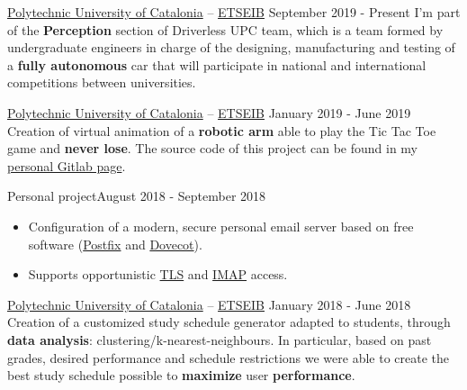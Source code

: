 \documentclass[10pt, a4paper, ragged2e]{altacv}
\begin{document}
{\href{https://www.upc.edu/en}{Polytechnic University of Catalonia} --
\href{https://etseib.upc.edu/en}{ETSEIB}}
{September 2019 - Present}{}
I'm part of the \textbf{Perception} section of Driverless UPC team, which is a
team formed by undergraduate engineers in charge of the designing, manufacturing
and testing of a \textbf{fully autonomous} car that will participate in national
and international competitions between universities.

\divider

{\href{https://www.upc.edu/en}{Polytechnic University of Catalonia} --
\href{https://etseib.upc.edu/en}{ETSEIB}}
{January 2019 - June 2019}{}
Creation of virtual animation of a \textbf{robotic arm} able to play the Tic
Tac Toe game and \textbf{never lose}. The source code of this project can be
found in my \href{https://gitlab.com/DavidAlvarez/}{personal Gitlab
  page\footnotemark}.

\divider

{Personal project}{August 2018 - September 2018}{}
\begin{itemize}
  \item Configuration of a modern, secure personal email server based on
  free software (\href{http://www.postfix.org/}{Postfix} and
  \href{https://www.dovecot.org/}{Dovecot}).
  \item Supports opportunistic
  \href{https://en.wikipedia.org/wiki/Transport_Layer_Security}{TLS} and
  \href{https://en.wikipedia.org/wiki/Internet_Message_Access_Protocol}
  {IMAP} access.
\end{itemize}

\divider

{\href{https://www.upc.edu/en}{Polytechnic University of Catalonia} --
\href{https://etseib.upc.edu/en}{ETSEIB}}
{January 2018 - June 2018}{}
Creation of a customized study schedule generator adapted to students, through
\textbf{data analysis}: clustering/k-nearest-neighbours. In particular, based on
past grades, desired performance and schedule restrictions we were able to
create the best study schedule possible to \textbf{maximize} user
\textbf{performance}.

\medskip


\end{document}
